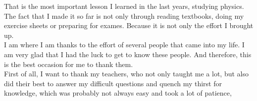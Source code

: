 \noindent That is the most important lesson I learned in the last years, studying physics. \\ 

\noindent The fact that I made it so far is not only through reading textbooks, doing my exercise sheets or preparing for exames. Because it is not only the effort I brought up. \\
I am where I am thanks to the effort of several people that came into my life. I am very glad that I had the luck to get to know these people. And therefore, this is the best occasion for me to thank them. \\

\noindent First of all, I want to thank my teachers, who not only taught me a lot, but also did their best to answer my difficult questions and quench my thirst for knowledge, which was probably not always easy and took a lot of patience, \\

